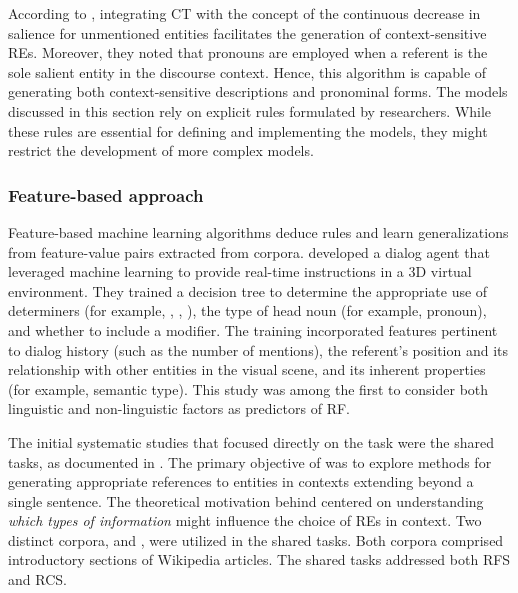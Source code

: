 According to \citet{krahmer2002efficient}, integrating CT with the concept of the continuous decrease in salience for unmentioned entities facilitates the generation of context-sensitive REs. 
Moreover, they noted that pronouns are employed when a referent is the sole salient entity in the discourse context. Hence, this algorithm is capable of generating both context-sensitive descriptions and pronominal forms. The models discussed in this section rely on explicit rules formulated by researchers. While these rules are essential for defining and implementing the models, they might restrict the development of more complex models.

\subsubsection{Feature-based approach}\label{subsubsec:featbased}

Feature-based machine learning algorithms deduce rules and learn generalizations from feature-value pairs extracted from corpora.
\citet{stoia2006noun} developed a dialog agent that leveraged machine learning to provide real-time instructions in a 3D virtual environment. They trained a decision tree to determine the appropriate use of determiners (for example, , , ), the type of head noun (for example, pronoun), and whether to include a modifier. The training incorporated features pertinent to dialog history (such as the number of mentions), the referent’s position and its relationship with other entities in the visual scene, and its inherent properties (for example, semantic type). This study was among the first to consider both linguistic and non-linguistic factors as predictors of RF.

The initial systematic studies that focused directly on the \context task were the \grec shared tasks, as documented in \citep{belz2010grec, belz2010generating}. The primary objective of \grec was to explore methods for generating appropriate references to entities in contexts extending beyond a single sentence. The theoretical motivation behind \grec centered on understanding \textit{which types of information} might influence the choice of REs in context. Two distinct corpora, \grectwo and \grecp, were utilized in the \grec shared tasks. Both corpora comprised introductory sections of Wikipedia articles. The \grec shared tasks addressed both RFS and RCS.

